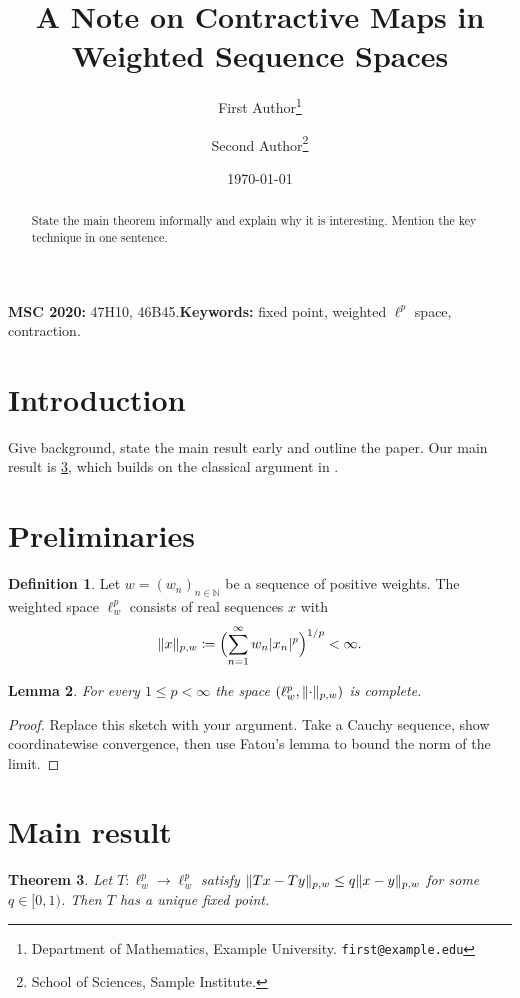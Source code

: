 \documentclass[11pt]{article}
\title{A Note on Contractive Maps in Weighted Sequence Spaces}
\author{First Author\thanks{Department of Mathematics, Example University. \texttt{first@example.edu}}
  \and Second Author\thanks{School of Sciences, Sample Institute.}}
\date{\today}
\theoremstyle{plain}
\newtheorem{theorem}{Theorem}[section]
\newtheorem{lemma}[theorem]{Lemma}
\theoremstyle{definition}
\newtheorem{definition}[theorem]{Definition}
\theoremstyle{remark}
\newcommand{\N}{\mathbb{N}}
\DeclarePairedDelimiter\abs{\lvert}{\rvert}
\DeclarePairedDelimiter\norm{\lVert}{\rVert}
\begin{document}
\maketitle

\begin{abstract}
State the main theorem informally and explain why it is interesting. Mention the key technique in one sentence.
\end{abstract}

\noindent\textbf{MSC 2020:} 47H10, 46B45.\quad \textbf{Keywords:} fixed point, weighted $\ell^p$ space, contraction.

\section{Introduction}
Give background, state the main result early and outline the paper.
Our main result is \cref{thm:main}, which builds on the classical argument in \cite{banach}.

\section{Preliminaries}
\begin{definition}\label{def:weighted}
Let $w = (w_n)_{n\in\N}$ be a sequence of positive weights. The weighted space $\ell^p_w$ consists of real sequences $x$ with
\[
  \norm{x}_{p,w} \coloneqq \Bigl( \sum_{n=1}^{\infty} w_n \abs{x_n}^p \Bigr)^{1/p} < \infty .
\]
\end{definition}

\begin{lemma}\label{lem:complete}
For every $1 \le p < \infty$ the space $(\ell^p_w, \norm{\cdot}_{p,w})$ is complete.
\end{lemma}

\begin{proof}
Replace this sketch with your argument. Take a Cauchy sequence, show coordinatewise convergence, then use Fatou's lemma to bound the norm of the limit.
\end{proof}

\section{Main result}
\begin{theorem}\label{thm:main}
Let $T\colon \ell^p_w \to \ell^p_w$ satisfy $\norm{Tx - Ty}_{p,w} \le q \norm{x-y}_{p,w}$ for some $q \in [0,1)$. Then $T$ has a unique fixed point.
\end{theorem}
\end{document}
